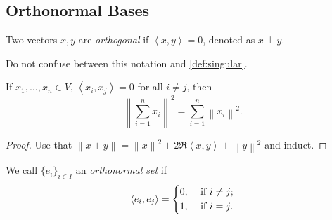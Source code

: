 \subsection{Orthonormal Bases}
\begin{definition}[Orthogonal]\label{def:orthogonal}
	Two vectors \(x, y\) are \emph{orthogonal} if \(\left< x,y \right> = 0\), denoted as \(x \perp y\).
\end{definition}
\begin{remark}
	Do not confuse between this notation and \autoref{def:singular}.
\end{remark}

\begin{lemma}\label{thm:Pythagorean-theorem}
	If \(x_1,\ldots,x_n \in V\), \(\left< x_i,x_j \right> = 0\) for all \(i \neq j\), then
	\[
		\left\lVert \sum\limits_{i=1}^{n} x_{i} \right\rVert ^{2} = \sum\limits_{i=1}^{n} \left\lVert x_{i} \right\rVert ^{2}.
	\]
\end{lemma}
\begin{proof}
	Use that \(\left\lVert x + y\right\rVert =\left\lVert x\right\rVert^2 + 2\Re\left< x,y \right> + \left\lVert y\right\rVert^2\) and induct.
\end{proof}

\begin{definition}\label{def:orthonormal-set}
	We call \(\{e_i\}_{i \in I}\) an \emph{orthonormal set} if
	\[
		\left< e_i,e_j \right> = \begin{dcases}
			0, & \text{ if } i \neq j ; \\
			1, & \text{ if } i = j .
		\end{dcases}
	\]
\end{definition}